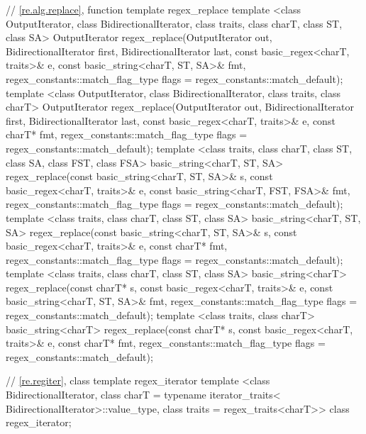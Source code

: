 \begin{codeblock}
{  // \ref{re.alg.replace}, function template regex_replace
  template <class OutputIterator, class BidirectionalIterator,
      class traits, class charT, class ST, class SA>
    OutputIterator
    regex_replace(OutputIterator out,
                  BidirectionalIterator first, BidirectionalIterator last,
                  const basic_regex<charT, traits>& e,
                  const basic_string<charT, ST, SA>& fmt,
                  regex_constants::match_flag_type flags =
                    regex_constants::match_default);
  template <class OutputIterator, class BidirectionalIterator,
      class traits, class charT>
    OutputIterator
    regex_replace(OutputIterator out,
                  BidirectionalIterator first, BidirectionalIterator last,
                  const basic_regex<charT, traits>& e,
                  const charT* fmt,
                  regex_constants::match_flag_type flags =
                    regex_constants::match_default);
  template <class traits, class charT, class ST, class SA,
      class FST, class FSA>
    basic_string<charT, ST, SA>
    regex_replace(const basic_string<charT, ST, SA>& s,
                  const basic_regex<charT, traits>& e,
                  const basic_string<charT, FST, FSA>& fmt,
                  regex_constants::match_flag_type flags =
                    regex_constants::match_default);
  template <class traits, class charT, class ST, class SA>
    basic_string<charT, ST, SA>
    regex_replace(const basic_string<charT, ST, SA>& s,
                  const basic_regex<charT, traits>& e,
                  const charT* fmt,
                  regex_constants::match_flag_type flags =
                    regex_constants::match_default);
  template <class traits, class charT, class ST, class SA>
    basic_string<charT>
    regex_replace(const charT* s,
                  const basic_regex<charT, traits>& e,
                  const basic_string<charT, ST, SA>& fmt,
                  regex_constants::match_flag_type flags =
                    regex_constants::match_default);
  template <class traits, class charT>
    basic_string<charT>
    regex_replace(const charT* s,
                  const basic_regex<charT, traits>& e,
                  const charT* fmt,
                  regex_constants::match_flag_type flags =
                    regex_constants::match_default);

  // \ref{re.regiter}, class template regex_iterator
  template <class BidirectionalIterator,
            class charT = typename iterator_traits<
              BidirectionalIterator>::value_type,
            class traits = regex_traits<charT>>
    class regex_iterator;

}
\end{codeblock}
